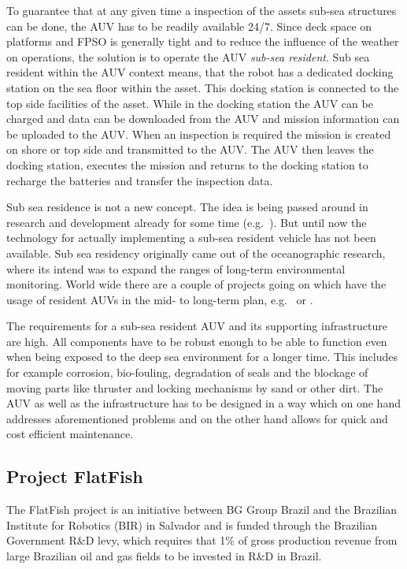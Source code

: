 \documentclass[conference]{IEEEtran}
\begin{document}
To guarantee that at any given time a inspection of the assets sub-sea structures can be
done, the AUV has to be readily available 24/7. Since deck space on platforms and FPSO is
generally tight and to reduce the influence of the weather on operations, the solution is
to operate the AUV \textit{sub-sea resident}. Sub sea resident within the AUV context
means, that the robot has a dedicated docking station on the sea floor within the asset.
This docking station is connected to the top side facilities of the asset. While in the
docking station the AUV can be charged and data can be downloaded from the AUV and 
mission
information can be uploaded to the AUV. When an inspection is required the mission is
created on shore or top side and transmitted to the AUV. The AUV then leaves the docking
station, executes the mission and returns to the docking station to recharge the batteries
and transfer the inspection data.

Sub sea residence is not a new concept. The idea is being passed around in research and
development already for some time (e.g.~\cite{mcleod2011}). But until now the technology
for actually implementing a sub-sea resident vehicle has not been available. Sub sea
residency originally came out of the oceanographic research, where its intend was to
expand the ranges of long-term environmental monitoring. World wide there are a couple of
projects going on which have the usage of resident AUVs in the mid- to long-term plan,
e.g.~\cite{german2012} or \cite{soltwedel2013}.

The requirements for a sub-sea resident AUV and its supporting infrastructure are high.
All components have to be robust enough to be able to function even when being exposed 
to
the deep sea environment for a longer time. This includes for example corrosion,
bio-fouling, degradation of seals and the blockage of moving parts like thruster and
locking mechanisms by sand or other dirt. The AUV as well as the infrastructure has to be
designed in a way which on one hand addresses aforementioned problems and on the other
hand allows for quick and cost efficient maintenance.

\subsection{Project FlatFish}

The FlatFish project is an initiative between BG Group Brazil and the Brazilian Institute
for Robotics (BIR) in Salvador and is funded through the Brazilian Government R\&D levy,
which requires that 1\% of gross production revenue from large Brazilian oil and gas
fields to be invested in R\&D in Brazil.
\end{document}
